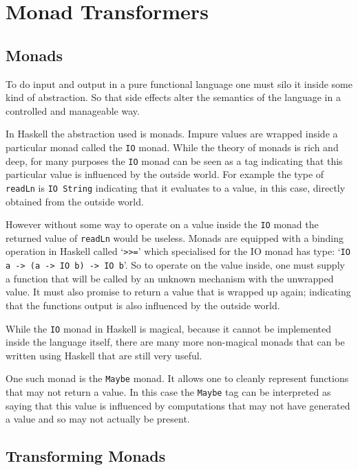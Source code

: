 \documentclass[]{article}
\newcommand{\function}[1]{\texttt{#1}}
\newcommand{\type}[1]{\texttt{#1}}
\begin{document}


\section{Monad Transformers}
\subsection{Monads}
To do input and output in a pure functional language one must silo it inside
some kind of abstraction. So that side effects alter the semantics of the
language in a controlled and manageable way.

In Haskell the abstraction used is monads. Impure values are wrapped inside a
particular monad called the \type{IO} monad. While the theory of monads is
rich and deep, for many purposes the \type{IO} monad can be seen as a tag
indicating that this particular value is influenced by the outside world. For
example the type of \function{readLn} is \type{IO String} indicating that it
evaluates to a value, in this case, directly obtained from the outside world.

However without some way to operate on a value inside the \type{IO} monad the
returned value of \function{readLn} would be useless. Monads are equipped with
a binding operation in Haskell called `\function{>>=}' which specialised for
the IO monad has type: `\type{IO a -> (a -> IO b) -> IO b}'. So to operate on
the value inside, one must supply a function that will be called by an unknown
mechanism with the unwrapped value. It must also promise to return a value
that is wrapped up again; indicating that the functions output is also
influenced by the outside world.

While the \type{IO} monad in Haskell is magical, because it cannot
be implemented inside the language itself, there are many
more non-magical monads that can be written using Haskell that are
still very useful.

One such monad is the \type{Maybe} monad. It allows one to cleanly represent
functions that may not return a value. In this case the \type{Maybe} tag can
be interpreted as saying that this value is influenced by computations that
may not have generated a value and so may not actually be present.

\subsection{Transforming Monads}
\label{discussion:monadtrans}
\end{document}

